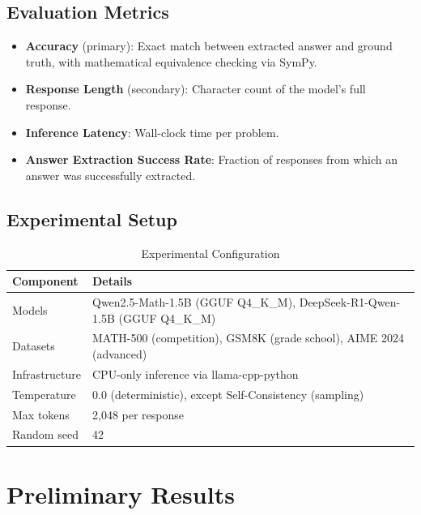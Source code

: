 \documentclass[conference]{IEEEtran}
\begin{document}
\subsection{Evaluation Metrics}

\begin{itemize}
    \item \textbf{Accuracy} (primary): Exact match between extracted answer and ground truth, with mathematical equivalence checking via SymPy.
    \item \textbf{Response Length} (secondary): Character count of the model's full response.
    \item \textbf{Inference Latency}: Wall-clock time per problem.
    \item \textbf{Answer Extraction Success Rate}: Fraction of responses from which an answer was successfully extracted.
\end{itemize}

\subsection{Experimental Setup}

\begin{table}[h]
\centering
\caption{Experimental Configuration}
\label{tab:setup}
\begin{tabular}{ll}
\toprule
\textbf{Component} & \textbf{Details} \\
\midrule
Models & Qwen2.5-Math-1.5B (GGUF Q4\_K\_M), DeepSeek-R1-Qwen-1.5B (GGUF Q4\_K\_M) \\
Datasets & MATH-500 (competition), GSM8K (grade school), AIME 2024 (advanced) \\
Infrastructure & CPU-only inference via llama-cpp-python \\
Temperature & 0.0 (deterministic), except Self-Consistency (sampling) \\
Max tokens & 2,048 per response \\
Random seed & 42 \\
\bottomrule
\end{tabular}
\end{table}

\section{Preliminary Results}
\end{document}

